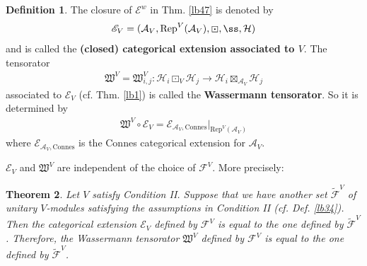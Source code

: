 \documentclass[11pt,b5paper,notitlepage]{article}
\theoremstyle{definition}
\newtheorem{df}{Definition}[section]
\theoremstyle{plain}
\newtheorem{thm}[df]{Theorem}
\newcommand{\fk}{\mathfrak}
\newcommand{\mc}{\mathcal}
\newcommand{\wtd}{\widetilde}
\newcommand{\Rep}{\mathrm{Rep}}
\newcommand{\scr}{\mathscr}
\newcommand{\Connes}{\mathrm{Connes}}
\numberwithin{equation}{section}
\begin{document}
\begin{df}\label{lb62}
The closure of $\scr E^w$ in Thm. \ref{lb47} is denoted by
\begin{align}
\scr E_V=(\mc A_V,\Rep^V(\mc A_V),\boxdot,\ss,\mc H)
\end{align}
and is called the \textbf{(closed) categorical extension associated to $V$}. The tensorator
\begin{align*}
\fk W^V=\fk W^V_{i,j}:\mc H_i\boxdot_V\mc H_j\rightarrow\mc H_i\boxtimes_{\mc A_V}\mc H_j
\end{align*}
associated to $\scr E_V$ (cf. Thm. \ref{lb1}) is called the \textbf{Wassermann tensorator}. So it is determined by
\begin{align}
\fk W^V\circ\scr E_V=\scr E_{\mc A_V,\Connes}\big|_{\Rep^V(\mc A_V)}
\end{align}
where $\scr E_{\mc A_V,\Connes}$ is the Connes categorical extension for $\mc A_V$.
\end{df}

$\scr E_V$ and $\fk W^V$ are independent of the choice of $\mc F^V$. More precisely:

\begin{thm}\label{lb60}
Let $V$ satisfy Condition II. Suppose that we have another set $\wtd{\mc F}^V$ of unitary $V$-modules satisfying the assumptions in Condition II (cf. Def. \ref{lb34}). Then the categorical extension $\scr E_V$ defined by $\mc F^V$ is equal to the one defined by $\wtd{\mc F}^V$. Therefore, the Wassermann tensorator $\fk W^V$ defined by $\mc F^V$ is equal to the one defined by $\wtd{\mc F}^V$.
\end{thm}
\end{document}
